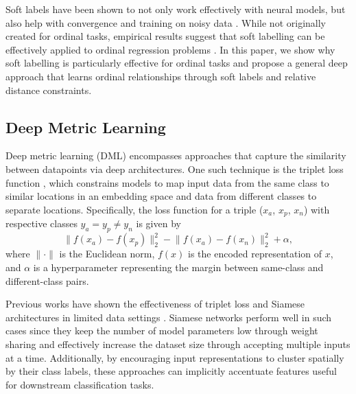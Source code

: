 Soft labels have been shown to not only work effectively with neural models, but also help with convergence and training on noisy data \cite{Hinton2015DistillingTK, zhang2019fsim}. %
While not originally created for ordinal tasks, empirical results %
suggest that soft labelling can be effectively applied to ordinal regression problems \cite{zhang2019fsim}.
In this paper, we show why soft labelling is particularly effective for ordinal tasks and propose a general deep approach that learns ordinal relationships through soft labels and relative distance constraints.

\subsection{Deep Metric Learning}

Deep metric learning (DML) encompasses approaches that capture the similarity between datapoints via deep architectures. %
One such technique is the triplet loss function \cite{schroff2015facenet},
which constrains models to map input data from the same class to similar locations in an embedding space and data from different classes to separate locations. Specifically, the loss function for a triple ($x_a$, $x_p$, $x_n$) with respective classes $y_a=y_p \neq y_n$ is given by
$$\lVert f(x_a) - f(x_p) \rVert_2^2 - \lVert f(x_a) - f(x_n) \rVert_2^2 + \alpha,$$
where $\lVert \cdot \rVert$ is the Euclidean norm, $f(x)$ is the encoded representation of $x$, and $\alpha$ is a hyperparameter representing the margin between same-class and different-class pairs.

Previous works have shown the effectiveness of triplet loss and Siamese architectures in limited data settings \cite{koch2015siamese}. %
Siamese networks perform well in such cases since they keep the number of model parameters low through weight sharing and effectively increase the dataset size through accepting multiple inputs at a time.
Additionally, by encouraging input representations to cluster spatially by their class labels, these approaches can implicitly accentuate features useful for downstream classification tasks.

